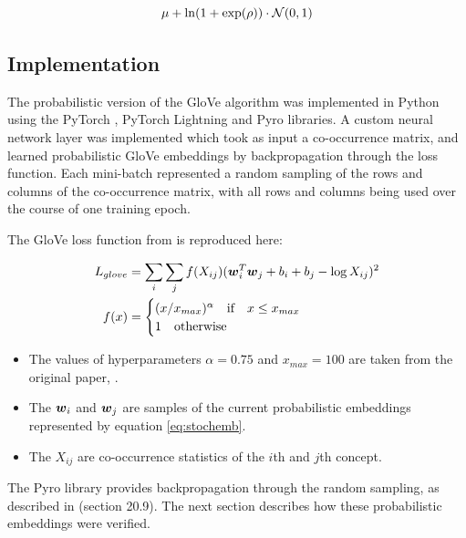 \begin{equation*}
\label{eq:stochemb}
    \mu + \ln (1 + \exp(\rho)) \cdot \mathcal{N}(0, 1)
\end{equation*}

\subsection{Implementation}

The probabilistic version of the GloVe algorithm was implemented in Python using the PyTorch \cite{pytorch}, PyTorch Lightning \cite{pytorchlightning} and Pyro \cite{pyro} libraries. A custom neural network layer was implemented which took as input a co-occurrence matrix, and learned probabilistic GloVe embeddings by backpropagation through the loss function. Each mini-batch represented a random sampling of the rows and columns of the co-occurrence matrix, with all rows and columns being used over the course of one training epoch. 

The GloVe loss function from \cite{pennington2014glove} is reproduced here:

\begin{equation}
\label{eq:gloveloss}
\begin{split}
L_{glove} &= \sum_i \sum_j f(X_{ij}) (\boldsymbol{w}_i^T \boldsymbol{w}_j + b_i + b_j - \log X_{ij})^2\\
f(x) &= \begin{cases}
(x/x_{max})^{\alpha}\quad \text{if} \quad x \le x_{max}\\
1\quad \text{otherwise} \quad
\end{cases}
\end{split}
\end{equation}

\begin{itemize}
    \item The values of hyperparameters $\alpha = 0.75$ and $x_{max} = 100$  are taken from the original paper, \cite{pennington2014glove}. 
    \item The $\boldsymbol{w}_i$ and $\boldsymbol{w}_j$ are samples of the current probabilistic embeddings represented by equation \ref{eq:stochemb}. 
    \item The $X_{ij}$ are co-occurrence statistics of the $i$th and $j$th concept.
\end{itemize}

The Pyro library provides backpropagation through the random sampling, as described in \cite{deeplearninggoodfellow} (section 20.9). The next section describes how these probabilistic embeddings were verified. 

